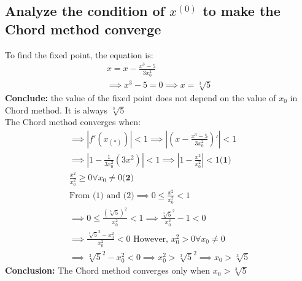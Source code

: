\subsection{Analyze the condition of $x^{(0)}$ to make the Chord method converge}
To find the fixed point, the equation is:
\begin{align*}
    x = x - \frac{x^{3} - 5}{3x_0^2} \\
    \implies x^{3} - 5 = 0
    \implies x = \sqrt[3]{5}
\end{align*}
\textbf{Conclude:} the value of the fixed point does not depend on the value of $x_0$ in Chord method. It is always $\sqrt[3]{5}$ \\
The Chord method converges when:
\begin{align*}
    \implies |f'(x_(*))| < 1
    \implies |(x - \frac{x^{3} - 5}{3x_0^2})'| < 1  \\
    \implies |1 - \frac{1}{3x_0^2}(3x^2)| < 1 
    \implies |1 - \frac{x^2}{x_0^2}| < 1 \textbf{(1)}\\
    \frac{x^2}{x_0^2} \ge 0 \forall x_0 \neq 0 \textbf{(2)}\\
    \text{From (1) and (2)}\implies 0 \le \frac{x^{2}}{x_0^2} < 1 \\
    \implies 0 \le \frac{(\sqrt[3]{5})^2}{x_0^2} < 1 
    \implies \frac{\sqrt[3]{5}^{2}}{x_0^2} - 1 < 0 \\
\implies \frac{\sqrt[3]{5}^{2}-x_0^2}{x_0^2} < 0 \text{ However, } x_0^2 > 0 \forall x_0 \neq 0 \\
    \implies \sqrt[3]{5}^2 - x_0^2 < 0
    \implies x_0^2 > \sqrt[3]{5}^2
    \implies x_0 > \sqrt[3]{5}
\end{align*}
\textbf{Conclusion:} The Chord method converges only when $x_0 > \sqrt[3]{5}$
\newpage

